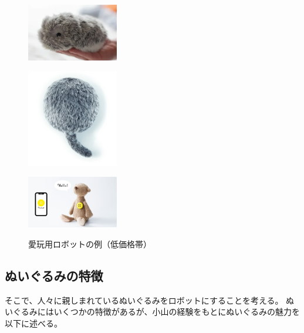 \documentclass[uplatex,a4paper,12pt]{jsarticle}
\begin{document}
\begin{figure}[htbp]
  \centering
  \begin{minipage}[c]{0.32\linewidth}
    \centering
    \includegraphics[keepaspectratio,width=4cm,clip]{images/previous_robots/moflin.png}
    \label{fig:moflin}
  \end{minipage}
  \begin{minipage}[c]{0.32\linewidth}
    \centering
    \includegraphics[keepaspectratio,width=4cm,clip]{images/previous_robots/qoobo.png}
    \label{fig:qoobo}
  \end{minipage}
  \begin{minipage}[c]{0.32\linewidth}
    \centering
    \includegraphics[keepaspectratio,width=4cm,clip]{images/previous_robots/pechat.jpg}
    \label{fig:pechat}
  \end{minipage}
  \caption{愛玩用ロボットの例（低価格帯）}
  \label{fig:previous_robots_inexpensive}
\end{figure}


\subsection{ぬいぐるみの特徴}

そこで、人々に親しまれているぬいぐるみをロボットにすることを考える。
ぬいぐるみにはいくつかの特徴があるが、小山の経験をもとにぬいぐるみの魅力を以下に述べる。
\end{document}
